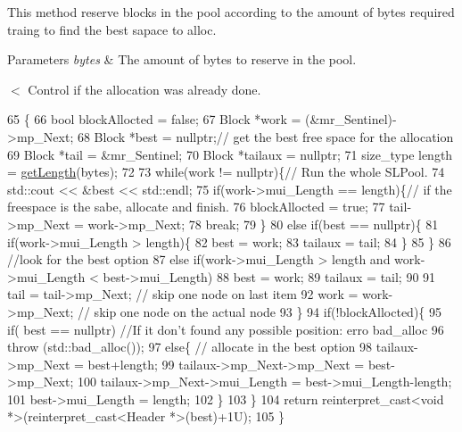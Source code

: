 This method reserve blocks in the pool according to the amount of bytes required traing to find the best sapace to alloc. 


\begin{DoxyParams}{Parameters}
{\em bytes} & The amount of bytes to reserve in the pool. \\
\hline
\end{DoxyParams}
$<$ Control if the allocation was already done. 
\begin{DoxyCode}
65                                              \{
66     \textcolor{keywordtype}{bool} blockAllocted = \textcolor{keyword}{false};
67     Block *work = (&mr\_Sentinel)->mp\_Next;
68     Block *best = \textcolor{keyword}{nullptr};\textcolor{comment}{// get the best free space for the allocation}
69     Block *tail = &mr\_Sentinel;
70     Block *tailaux = \textcolor{keyword}{nullptr};
71     size\_type length = \hyperlink{class_s_l_pool_a63cfa56c62750f1dd15a73d5a2ea42c3}{getLength}(bytes);
72 
73     \textcolor{keywordflow}{while}(work != \textcolor{keyword}{nullptr})\{\textcolor{comment}{// Run the whole SLPool.}
74         std::cout << &best << std::endl;
75         \textcolor{keywordflow}{if}(work->mui\_Length == length)\{\textcolor{comment}{// if the freespace is the sabe, allocate and finish.}
76             blockAllocted = \textcolor{keyword}{true};
77             tail->mp\_Next = work->mp\_Next;
78             \textcolor{keywordflow}{break};
79         \}
80         \textcolor{keywordflow}{else} \textcolor{keywordflow}{if}(best == \textcolor{keyword}{nullptr})\{
81             \textcolor{keywordflow}{if}(work->mui\_Length > length)\{
82                 best = work;
83                 tailaux = tail;
84             \}
85         \}
86         \textcolor{comment}{//look for the best option}
87         \textcolor{keywordflow}{else} \textcolor{keywordflow}{if}(work->mui\_Length > length and work->mui\_Length < best->mui\_Length)
88                 best = work;
89                 tailaux = tail;
90 
91         tail = tail->mp\_Next; \textcolor{comment}{// skip one node on last item}
92         work = work->mp\_Next; \textcolor{comment}{// skip one node on the actual node}
93     \}
94     \textcolor{keywordflow}{if}(!blockAllocted)\{
95         \textcolor{keywordflow}{if}( best == \textcolor{keyword}{nullptr}) \textcolor{comment}{//If it don't found any possible position: erro bad\_alloc}
96             \textcolor{keywordflow}{throw} (std::bad\_alloc());
97         \textcolor{keywordflow}{else}\{ \textcolor{comment}{// allocate in the best option}
98             tailaux->mp\_Next = best+length;
99             tailaux->mp\_Next->mp\_Next = best->mp\_Next;
100             tailaux->mp\_Next->mui\_Length = best->mui\_Length-length;
101             best->mui\_Length = length;
102         \}
103     \}
104     \textcolor{keywordflow}{return} \textcolor{keyword}{reinterpret\_cast<}\textcolor{keywordtype}{void} *\textcolor{keyword}{>}(\textcolor{keyword}{reinterpret\_cast<}Header *\textcolor{keyword}{>}(best)+1U);
105 \}
\end{DoxyCode}
